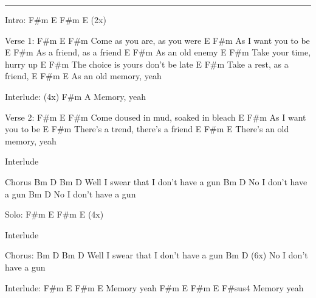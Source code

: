 \noindent\rule{\columnwidth}{1pt}

\begin{multicols}{2}
\begin{lstsong}
Intro: F#m E F#m E (2x)

Verse 1:
F#m          E          F#m
Come as you are, as you were
     E           F#m
As I want you to be
     E            F#m
As a friend, as a friend
      E       F#m
As an old enemy
          E           F#m
Take your time, hurry up
              E              F#m
The choice is yours don't be late
       E          F#m
Take a rest, as a friend,
      E      F#m  E
As an old memory, yeah
 
Interlude: (4x)
F#m     A
Memory, yeah

Verse 2:
F#m              E               F#m
Come doused in mud, soaked in bleach
          E           F#m
As I want you to be
                    E                F#m
There's a trend, there's a friend
                    E       F#m  E
There's an old memory, yeah
\end{lstsong}\vfill\columnbreak\begin{lstsong}
Interlude

Chorus
Bm           D           Bm                D
Well I swear that I don't have a gun
          Bm             D
No I don't have a gun
          Bm             D
No I don't have a gun
 
Solo: F#m E F#m E (4x)
 
Interlude
 
Chorus:
Bm                  D           Bm          D
 Well I swear that I don't have a gun
          Bm             D    (6x)
No I don't have a gun
 
Interlude:
F#m    E          F#m   E
                Memory yeah
F#m    E          F#m   E    F#sus4
                Memory yeah
\end{lstsong}
\end{multicols}
\newpage



